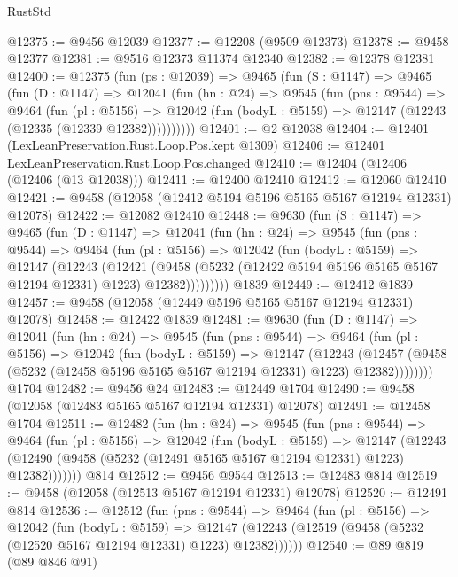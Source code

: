 \begin{lexlean}{RustStd}
\begin{coremodule}
@12375 := @9456 @12039
@12377 := @12208 (@9509 @12373)
@12378 := @9458 @12377
@12381 := @9516 @12373 @11374 @12340
@12382 := @12378 @12381
@12400 := @12375
    (fun (ps : @12039) =>
    @9465
      (fun (S : @1147) =>
      @9465
        (fun (D : @1147) =>
        @12041
          (fun (hn : @24) =>
          @9545
            (fun (pns : @9544) =>
            @9464
              (fun (pl : @5156) =>
              @12042 (fun (bodyL : @5159) => @12147 (@12243 (@12335 (@12339 @12382))))))))))
@12401 := @2 @12038
@12404 := @12401 (LexLeanPreservation.Rust.Loop.Pos.kept @1309)
@12406 := @12401 LexLeanPreservation.Rust.Loop.Pos.changed
@12410 := @12404 (@12406 (@12406 (@13 @12038)))
@12411 := @12400 @12410
@12412 := @12060 @12410
@12421 := @9458 (@12058 (@12412 @5194 @5196 @5165 @5167 @12194 @12331) @12078)
@12422 := @12082 @12410
@12448 := @9630
    (fun (S : @1147) =>
    @9465
      (fun (D : @1147) =>
      @12041
        (fun (hn : @24) =>
        @9545
          (fun (pns : @9544) =>
          @9464
            (fun (pl : @5156) =>
            @12042
              (fun (bodyL : @5159) =>
              @12147
                (@12243
                  (@12421
                    (@9458
                      (@5232 (@12422 @5194 @5196 @5165 @5167 @12194 @12331) @1223)
                      @12382)))))))))
    @1839
@12449 := @12412 @1839
@12457 := @9458 (@12058 (@12449 @5196 @5165 @5167 @12194 @12331) @12078)
@12458 := @12422 @1839
@12481 := @9630
    (fun (D : @1147) =>
    @12041
      (fun (hn : @24) =>
      @9545
        (fun (pns : @9544) =>
        @9464
          (fun (pl : @5156) =>
          @12042
            (fun (bodyL : @5159) =>
            @12147
              (@12243
                (@12457 (@9458 (@5232 (@12458 @5196 @5165 @5167 @12194 @12331) @1223) @12382))))))))
    @1704
@12482 := @9456 @24
@12483 := @12449 @1704
@12490 := @9458 (@12058 (@12483 @5165 @5167 @12194 @12331) @12078)
@12491 := @12458 @1704
@12511 := @12482
    (fun (hn : @24) =>
    @9545
      (fun (pns : @9544) =>
      @9464
        (fun (pl : @5156) =>
        @12042
          (fun (bodyL : @5159) =>
          @12147
            (@12243 (@12490 (@9458 (@5232 (@12491 @5165 @5167 @12194 @12331) @1223) @12382)))))))
    @814
@12512 := @9456 @9544
@12513 := @12483 @814
@12519 := @9458 (@12058 (@12513 @5167 @12194 @12331) @12078)
@12520 := @12491 @814
@12536 := @12512
    (fun (pns : @9544) =>
    @9464
      (fun (pl : @5156) =>
      @12042
        (fun (bodyL : @5159) =>
        @12147 (@12243 (@12519 (@9458 (@5232 (@12520 @5167 @12194 @12331) @1223) @12382))))))
@12540 := @89 @819 (@89 @846 @91)

\end{coremodule}
\end{lexlean}

